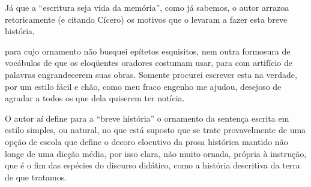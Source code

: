 Já que a ``escritura seja vida da memória'',
como já sabemos, o autor arrazoa retoricamente (e citando Cícero) os
motivos que o levaram a fazer esta breve história, 

\begin{hedraquote}
para cujo ornamento não busquei epítetos
esquisitos, nem outra formosura de vocábulos de que os eloqüentes
oradores costumam usar, para com artifício de palavras engrandecerem
suas obras. Somente procurei escrever esta na verdade, por um estilo
fácil e chão, como meu fraco engenho me ajudou, desejoso de agradar a
todos os que dela quiserem ter notícia.
\end{hedraquote}

O autor aí define para a ``breve história'' o
ornamento da sentença escrita em estilo simples, ou natural, no que
está suposto que se trate provavelmente de uma opção de escola que
define o decoro elocutivo da prosa histórica mantido não longe de uma
dicção média, por isso clara, não muito ornada, própria à instrução,
que é o fim das espécies do discurso didático, como a história
descritiva da terra de que tratamos.

